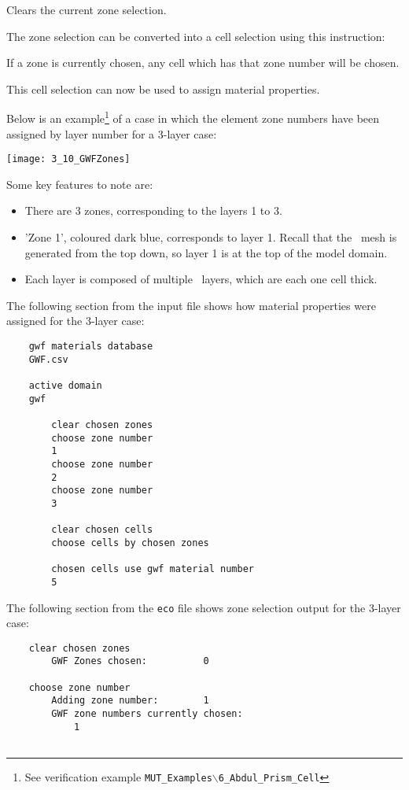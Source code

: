 {
    {Clears the current zone selection.
     }

The zone selection can be converted into a cell selection using this instruction:

    {If a zone is currently chosen, any cell which has that zone number will be chosen.
     }

This cell selection can now be used to assign material properties.

Below is an example\footnote{See verification example \texttt{MUT\_Examples$\backslash$6\_Abdul\_Prism\_Cell}} of a case in which the element zone numbers have been assigned by layer number for a 3-layer case:

\texttt{[image: 3\_10\_GWFZones]}

Some key features to note are:
\begin{itemize}
    \item There are 3 zones, corresponding to the layers 1 to 3.
    \item 'Zone 1', coloured dark blue, corresponds to layer 1.  Recall that the \mfus\ mesh is generated from the top down, so layer 1 is at the top of the model domain.
    \item Each layer is composed of multiple \mf\ layers, which are each one cell thick.
\end{itemize}

The following section from the input file shows how material properties were assigned for the 3-layer case:
\begin{verbatim}
    gwf materials database
    GWF.csv

    active domain
    gwf

        clear chosen zones
        choose zone number
        1
        choose zone number
        2
        choose zone number
        3

        clear chosen cells
        choose cells by chosen zones

        chosen cells use gwf material number
        5
\end{verbatim}

The following section from the \texttt{eco} file shows zone selection output for the 3-layer case:
\begin{verbatim}
    clear chosen zones
    	GWF Zones chosen:          0

    choose zone number
    	Adding zone number:        1
    	GWF zone numbers currently chosen:
    	    1


\end{verbatim}}
